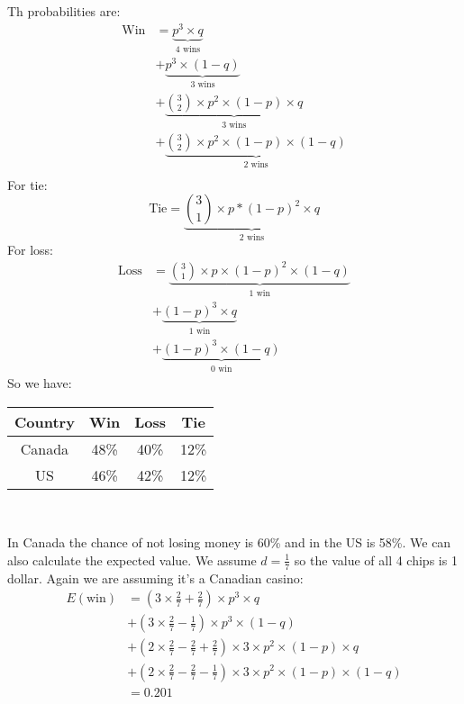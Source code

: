 \documentclass{book}
\begin{document}
	Th probabilities are:
	\begin{equation*}
		\begin{split}
			\text{Win} &= \underbrace{p^3 \times q}_{\text{4 wins}} \\
			&+ \underbrace{p^3 \times (1 - q)}_\text{3 wins} \\
			&+ \underbrace{\binom{3}{2} \times p^2 \times (1 - p) \times q}_\text{3 wins} \\
			&+ \underbrace{\binom{3}{2} \times p^2 \times (1 - p) \times (1 - q)}_\text{2 wins} \\
		\end{split}
	\end{equation*}
	For tie:
	\begin{equation*}
		\text{Tie} = \underbrace{\binom{3}{1} \times p * (1 - p)^2 \times q}_\text{2 wins}
	\end{equation*}
	For loss:
	\begin{equation*}
		\begin{split}
			\text{Loss} &= \underbrace{\binom{3}{1} \times p \times (1 - p)^2 \times (1 - q)}_\text{1 win} \\
			&+ \underbrace{(1 - p)^3 \times q}_\text{1 win} \\
			&+ \underbrace{(1 - p)^3 \times (1 - q)}_\text{0 win}
		\end{split}
	\end{equation*}
	So we have: \\
	\par 
	\begin{tabular}[h!]{c c c c}
		\toprule
		Country & Win & Loss & Tie \\
		\midrule
		Canada & 48\% & 40\% & 12\% \\
		US & 46\% & 42\% & 12\% \\
		\bottomrule
	\end{tabular} \\
	\par In Canada the chance of not losing money is 60\% and in the US is 58\%. We can also calculate the expected value. We assume $d = \frac{1}{7}$ so the value of all 4 chips is 1 dollar. Again we are assuming it's a Canadian casino:
	\begin{equation*}
		\begin{split}
			E(\text{win}) &= (3 \times \frac{2}{7} + \frac{2}{7}) \times p^3 \times q \\
			&+ (3 \times \frac{2}{7} - \frac{1}{7}) \times p^3 \times (1 - q) \\
			&+ (2 \times \frac{2}{7} - \frac{2}{7} + \frac{2}{7}) \times 3 \times p^2 \times (1 - p) \times q \\
			&+ (2 \times \frac{2}{7} - \frac{2}{7} - \frac{1}{7}) \times 3 \times p^2 \times (1 - p) \times (1 - q) \\
			&= 0.201
		\end{split}
	\end{equation*}
\end{document}
